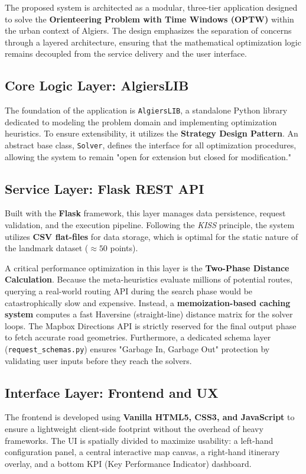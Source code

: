 
The proposed system is architected as a modular, three-tier application designed to solve the \textbf{Orienteering Problem with Time Windows (OPTW)} within the urban context of Algiers. The design emphasizes the separation of concerns through a layered architecture, ensuring that the mathematical optimization logic remains decoupled from the service delivery and the user interface.

\subsection{Core Logic Layer: AlgiersLIB}
The foundation of the application is \texttt{AlgiersLIB}, a standalone Python library dedicated to modeling the problem domain and implementing optimization heuristics. To ensure extensibility, it utilizes the \textbf{Strategy Design Pattern}. An abstract base class, \texttt{Solver}, defines the interface for all optimization procedures, allowing the system to remain "open for extension but closed for modification."

\subsection{Service Layer: Flask REST API}
Built with the \textbf{Flask} framework, this layer manages data persistence, request validation, and the execution pipeline. Following the \textit{KISS} principle, the system utilizes \textbf{CSV flat-files} for data storage, which is optimal for the static nature of the landmark dataset ($\approx 50$ points). 

A critical performance optimization in this layer is the \textbf{Two-Phase Distance Calculation}. Because the meta-heuristics evaluate millions of potential routes, querying a real-world routing API during the search phase would be catastrophically slow and expensive. Instead, a \textbf{memoization-based caching system} computes a fast Haversine (straight-line) distance matrix for the solver loops. The Mapbox Directions API is strictly reserved for the final output phase to fetch accurate road geometries. Furthermore, a dedicated schema layer (\texttt{request\_schemas.py}) ensures "Garbage In, Garbage Out" protection by validating user inputs before they reach the solvers.

\subsection{Interface Layer: Frontend and UX}
The frontend is developed using \textbf{Vanilla HTML5, CSS3, and JavaScript} to ensure a lightweight client-side footprint without the overhead of heavy frameworks. The UI is spatially divided to maximize usability: a left-hand configuration panel, a central interactive map canvas, a right-hand itinerary overlay, and a bottom KPI (Key Performance Indicator) dashboard.

